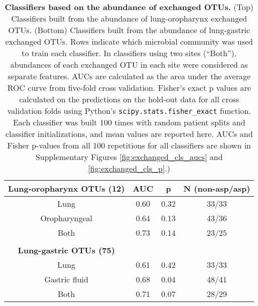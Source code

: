 \FloatBarrier


\begin{table}
\begin{center}

\begin{tabular}{cccc}
\textbf{Lung-oropharynx OTUs (12)} & AUC & p & N (non-asp/asp) \\
\midrule
Lung & 0.60 & 0.32 & 33/33 \\
Oropharyngeal & 0.64 & 0.13 & 43/36 \\
Both & 0.73 & 0.14 & 23/25 \\
\bottomrule
\\
\textbf{Lung-gastric OTUs (75)} &  & & \\
\midrule
Lung & 0.61 & 0.42 & 33/33 \\
Gastric fluid & 0.68 & 0.04 & 48/41 \\
Both & 0.71 & 0.07 & 28/29 \\
\bottomrule
\end{tabular}
\caption{\textbf{Classifiers based on the abundance of exchanged OTUs.} (Top) Classifiers built from the abundance of lung-oropharynx exchanged OTUs. (Bottom) Classifiers built from the abundance of lung-gastric exchanged OTUs. Rows indicate which microbial community was used to train each classifier. In classifiers using two sites (``Both''), abundances of each exchanged OTU in each site were considered as separate features. AUCs are calculated as the area under the average ROC curve from five-fold cross validation. Fisher's exact p values are calculated on the predictions on the hold-out data for all cross validation folds using Python's \texttt{scipy.stats.fisher\_exact} function. Each classifier was built 100 times with random patient splits and classifier initializations, and mean values are reported here. AUCs and Fisher p-values from all 100 repetitions for all classifiers are shown in Supplementary Figures \ref{fig:exchanged_cls_aucs} and \ref{fig:exchanged_cls_p}.)}\label{tab:abun-exchange-classifiers}
\end{center}
\end{table}
\normalsize


